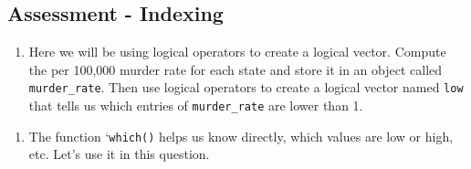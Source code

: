 \documentclass[]{article}
\newenvironment{Shaded}{\begin{snugshade}}{\end{snugshade}}
\newcommand{\CommentTok}[1]{\textcolor[rgb]{0.56,0.35,0.01}{\textit{#1}}}
\newcommand{\DecValTok}[1]{\textcolor[rgb]{0.00,0.00,0.81}{#1}}
\newcommand{\KeywordTok}[1]{\textcolor[rgb]{0.13,0.29,0.53}{\textbf{#1}}}
\newcommand{\NormalTok}[1]{#1}
\newcommand{\OperatorTok}[1]{\textcolor[rgb]{0.81,0.36,0.00}{\textbf{#1}}}
\newcommand{\StringTok}[1]{\textcolor[rgb]{0.31,0.60,0.02}{#1}}
\providecommand{\tightlist}{%
  \setlength{\itemsep}{0pt}\setlength{\parskip}{0pt}}
\begin{document}
\hypertarget{assessment---indexing}{%
\subsection{Assessment - Indexing}\label{assessment---indexing}}

\begin{enumerate}
\def\labelenumi{\arabic{enumi}.}
\tightlist
\item
  Here we will be using logical operators to create a logical vector.
  Compute the per 100,000 murder rate for each state and store it in an
  object called \texttt{murder\_rate}. Then use logical operators to
  create a logical vector named \texttt{low} that tells us which entries
  of \texttt{murder\_rate} are lower than 1.
\end{enumerate}

\begin{Shaded}
\end{Shaded}

\begin{enumerate}
\def\labelenumi{\arabic{enumi}.}
\setcounter{enumi}{1}
\tightlist
\item
  The function `\texttt{which()} helps us know directly, which values
  are low or high, etc. Let's use it in this question.
\end{enumerate}

\begin{Shaded}
\end{Shaded}
\end{document}

